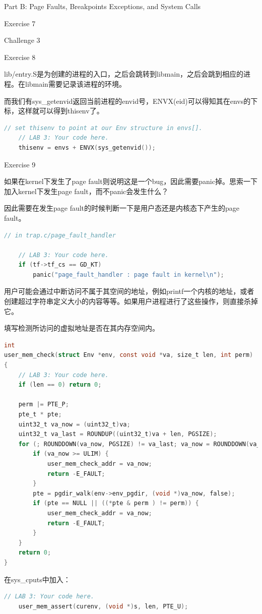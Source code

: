 \documentclass[GBK,winfonts,a4paper,10pt]{ctexart}
\begin{document}
\begin{section}{ Part B: Page Faults, Breakpoints Exceptions, and System Calls }
\begin{subsection}{ Exercise 7 }
\end{subsection}

\begin{subsection}{ Challenge 3 }

\end{subsection}

\begin{subsection}{ Exercise 8 }
\par
lib/entry.S是为创建的进程的入口，之后会跳转到libmain，之后会跳到相应的进程。在libmain需要记录该进程的环境。
\par
而我们有sys\_getenvid返回当前进程的envid号，ENVX(eid)可以得知其在envs的下标，这样就可以得到thisenv了。
\begin{lstlisting}[language=C]
	// set thisenv to point at our Env structure in envs[].
	// LAB 3: Your code here.
	thisenv = envs + ENVX(sys_getenvid());
\end{lstlisting}

\end{subsection}

\begin{subsection}{ Exercise 9 }
\par
如果在kernel下发生了page fault则说明这是一个bug，因此需要panic掉。思索一下加入kernel下发生page fault，而不panic会发生什么？
\par
因此需要在发生page fault的时候判断一下是用户态还是内核态下产生的page fault。
\par
\begin{lstlisting}[language=C]
// in trap.c/page_fault_handler

	// LAB 3: Your code here.
	if (tf->tf_cs == GD_KT)
    	panic("page_fault_handler : page fault in kernel\n");
\end{lstlisting}

\par
用户可能会通过中断访问不属于其空间的地址，例如printf一个内核的地址，或者创建超过字符串定义大小的内容等等。如果用户进程进行了这些操作，则直接杀掉它。
\par
填写检测所访问的虚拟地址是否在其内存空间内。
\begin{lstlisting}[language=C]
int
user_mem_check(struct Env *env, const void *va, size_t len, int perm)
{
	// LAB 3: Your code here.
	if (len == 0) return 0;		

	perm |= PTE_P;
	pte_t * pte;
	uint32_t va_now = (uint32_t)va;
	uint32_t va_last = ROUNDUP((uint32_t)va + len, PGSIZE);
	for (; ROUNDDOWN(va_now, PGSIZE) != va_last; va_now = ROUNDDOWN(va_now + PGSIZE, PGSIZE)) {
		if (va_now >= ULIM) {
			user_mem_check_addr = va_now;
			return -E_FAULT;
		}
		pte = pgdir_walk(env->env_pgdir, (void *)va_now, false);
		if (pte == NULL || ((*pte & perm ) != perm)) {
			user_mem_check_addr = va_now;
			return -E_FAULT;
		}
	}
	return 0;
}
\end{lstlisting}
\par
在sys\_cputs中加入：
\begin{lstlisting}[language=C]
	// LAB 3: Your code here.
    user_mem_assert(curenv, (void *)s, len, PTE_U);
\end{lstlisting}


\end{subsection}
\end{section}
\end{document}
